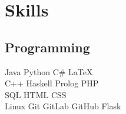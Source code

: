







\section{Skills}

\subsection{Programming}

Java \textbullet{} Python \textbullet{} C# \textbullet{} \LaTeX\ \\ 
C++ \textbullet{} Haskell \textbullet{} Prolog \textbullet{} PHP\\ \textbullet{} SQL \textbullet{} HTML \textbullet{} CSS \\
Linux \textbullet{} Git \textbullet{} GitLab \textbullet{} GitHub \textbullet{} Flask


